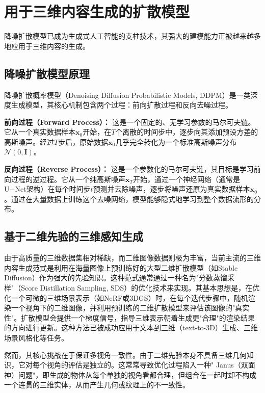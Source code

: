 \section{用于三维内容生成的扩散模型}

降噪扩散模型已成为生成式人工智能的支柱技术，其强大的建模能力正被越来越多地应用于三维内容的生成。

\subsection{降噪扩散模型原理}

降噪扩散概率模型（Denoising Diffusion Probabilistic Models, DDPM）是一类深度生成模型，其核心机制包含两个过程：前向扩散过程和反向去噪过程\cite{ho2020denoising}。

\textbf{前向过程（Forward Process）：} 这是一个固定的、无学习参数的马尔可夫链。它从一个真实数据样本$\mathbf{x}_0$开始，在$T$个离散的时间步中，逐步向其添加预设方差的高斯噪声。经过$T$步后，原始数据$\mathbf{x}_0$几乎完全转化为一个标准高斯噪声分布$\mathcal{N}(0, \mathbf{I})$。

\textbf{反向过程（Reverse Process）：} 这是一个参数化的马尔可夫链，其目标是学习前向过程的逆过程。它从一个纯高斯噪声$\mathbf{x}_T$开始，通过一个神经网络（通常是U−Net架构）在每个时间步$t$预测并去除噪声，逐步将噪声还原为真实数据样本$\mathbf{x}_0$。通过在大量数据上训练这个去噪网络，模型能够隐式地学习到整个数据流形的分布。

\subsection{基于二维先验的三维感知生成}

由于高质量的三维数据集相对稀缺，而二维图像数据则极为丰富，当前主流的三维内容生成范式是利用在海量图像上预训练好的大型二维扩散模型（如Stable Diffusion）作为强大的先验知识。这种范式通常通过一种名为"分数蒸馏采样"（Score Distillation Sampling, SDS）的优化技术来实现\cite{ho2020denoising}。其基本思想是，在优化一个可微的三维场景表示（如NeRF或3DGS）时，在每个迭代步骤中，随机渲染一个视角下的二维图像，并利用预训练的二维扩散模型来评估该图像的"真实性"。扩散模型会提供一个梯度信号，指导三维表示朝着生成更"合理"的渲染结果的方向进行更新。这种方法已被成功应用于文本到三维（text-to-3D）生成、三维场景风格化等任务\cite{kerbl2023gaussian}。

然而，其核心挑战在于保证多视角一致性。由于二维先验本身不具备三维几何知识，它对每个视角的评估是独立的。这常常导致优化过程陷入一种" Janus（双面神）问题"，即生成的物体从每个单独的视角看都合理，但组合在一起时却不构成一个连贯的三维实体，从而产生几何或纹理上的不一致性\cite{kerbl2023gaussian}。

